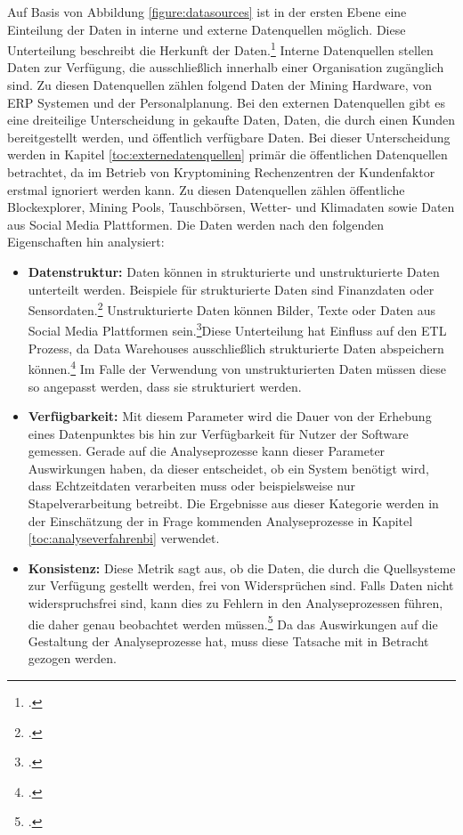 Auf Basis von Abbildung \ref{figure:datasources} ist in der ersten Ebene eine Einteilung der Daten in interne und externe
Datenquellen möglich. Diese Unterteilung beschreibt die Herkunft der Daten.\footcite[Vgl.][Abb. 1]{hartmann2016capturing}
Interne Datenquellen stellen Daten zur Verfügung, die ausschließlich innerhalb einer Organisation zugänglich sind. Zu diesen
Datenquellen zählen folgend Daten der Mining Hardware, von \ac{ERP} Systemen und der Personalplanung. Bei den externen
Datenquellen gibt es eine dreiteilige Unterscheidung in gekaufte Daten, Daten, die durch einen Kunden bereitgestellt werden,
und öffentlich verfügbare Daten. Bei dieser Unterscheidung werden in Kapitel \ref{toc:externedatenquellen} primär die
öffentlichen Datenquellen betrachtet, da im Betrieb von Kryptomining Rechenzentren der Kundenfaktor erstmal ignoriert werden
kann. Zu diesen Datenquellen zählen öffentliche Blockexplorer, Mining Pools, Tauschbörsen, Wetter- und Klimadaten sowie
Daten aus Social Media Plattformen. Die Daten werden nach den folgenden Eigenschaften hin analysiert:
\begin{itemize}
    \item \textbf{Datenstruktur: }Daten können in strukturierte und unstrukturierte Daten unterteilt werden. Beispiele für
    strukturierte Daten sind Finanzdaten oder Sensordaten.\footcite[Vgl.][S. 27]{kimble2015big} Unstrukturierte Daten
    können Bilder, Texte oder Daten aus Social Media Plattformen sein.\footcite[Vgl.][S. 27]{kimble2015big}Diese Unterteilung
    hat Einfluss auf den \ac{ETL} Prozess, da Data Warehouses ausschließlich strukturierte Daten abspeichern
    können.\footcite[Vgl.][S.21]{niu2009cognition} Im Falle der Verwendung von unstrukturierten Daten müssen diese so angepasst
    werden, dass sie strukturiert werden.
    \item \textbf{Verfügbarkeit: }Mit diesem Parameter wird die Dauer von der Erhebung eines Datenpunktes bis hin zur
    Verfügbarkeit für Nutzer der Software gemessen. Gerade auf die Analyseprozesse kann dieser Parameter Auswirkungen
    haben, da dieser entscheidet, ob ein System benötigt wird, dass Echtzeitdaten verarbeiten muss oder beispielsweise nur
    Stapelverarbeitung betreibt. Die Ergebnisse aus dieser Kategorie werden in der Einschätzung der in Frage kommenden
    Analyseprozesse in Kapitel \ref{toc:analyseverfahrenbi} verwendet.
    \item \textbf{Konsistenz: }Diese Metrik sagt aus, ob die Daten, die durch die Quellsysteme zur Verfügung gestellt werden,
    frei von Widersprüchen sind. Falls Daten nicht widerspruchsfrei sind, kann dies zu Fehlern in den Analyseprozessen führen,
    die daher genau beobachtet werden müssen.\footcite[Vgl.][S. 561]{huh1990data} Da das Auswirkungen auf die Gestaltung
    der Analyseprozesse hat, muss diese Tatsache mit in Betracht gezogen werden.
\end{itemize}

